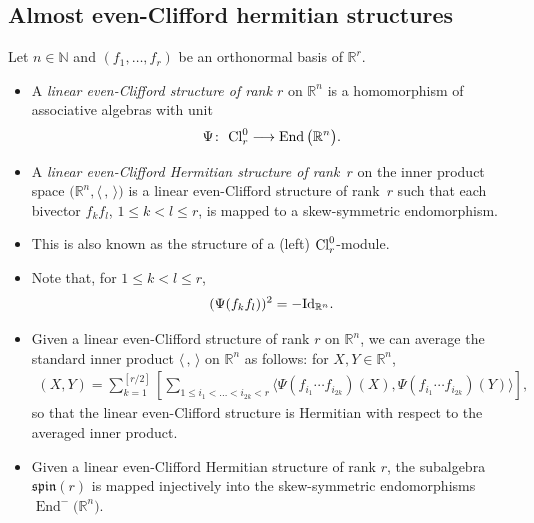 \documentclass[10pt,a4paper]{amsart}
\numberwithin{equation}{section}
\begin{document}
\subsection{Almost even-Clifford hermitian structures}\label{subsec: almost even-Clifford hermitian structures}
\begin{Definition} Let $n\in \mathbb{N}$ and $(f_1,\dots,f_r)$ be an orthonormal basis of $\mathbb{R}^r$.
\begin{itemize}\itemsep=0pt
\item A {\em linear even-Clifford structure of rank $r$} on $\mathbb{R}^n$ is a homomorphism of associative algebras with unit
\begin{gather*}\Psi\colon \ {\rm Cl}_r^0\longrightarrow \operatorname{End}\big(\mathbb{R}^n\big).\end{gather*}
\item A {\em linear even-Clifford Hermitian structure of rank~$r$} on the inner product space $\big(\mathbb{R}^n,\langle \,,\,\rangle \big)$ is a linear even-Clifford structure of rank~$r$ such that each bivector $f_kf_l$, $1\leq k< l \leq r$, is mapped to a skew-symmetric
endomorphism.
\end{itemize}
\end{Definition}

\begin{Remark}\quad
\begin{itemize}\itemsep=0pt
\item This is also known as the structure of a (left) ${\rm Cl}_r^0$-module.
\item Note that, for $1\leq k<l\leq r$,
\begin{gather*}
(\Psi(f_kf_l))^2=-{\rm Id}_{\mathbb{R}^n}.
\end{gather*}
\item Given a linear even-Clifford structure of rank $r$ on $\mathbb{R}^n$, we can average the standard inner product $\langle \,,\,\rangle $ on $\mathbb{R}^n$ as follows: for $X,Y\in\mathbb{R}^n$,
\begin{gather*}(X,Y)=\sum_{k=1}^{[r/2]} \left[\sum_{1\leq i_1<\dots<i_{2k}<r}
\langle \Psi(f_{i_1}\cdots f_{i_{2k}})(X),\Psi(f_{i_1}\cdots f_{i_{2k}})(Y)\rangle \right], \end{gather*}
so that the linear even-Clifford structure is Hermitian with respect to the averaged inner product.
\item Given a linear even-Clifford Hermitian structure of rank $r$, the subalgebra $\mathfrak{spin}(r)$ is mapped injectively into the skew-symmetric endomorphisms $\operatorname{End}^-\big(\mathbb{R}^n\big)$.
\end{itemize}
\end{Remark}
\end{document}
